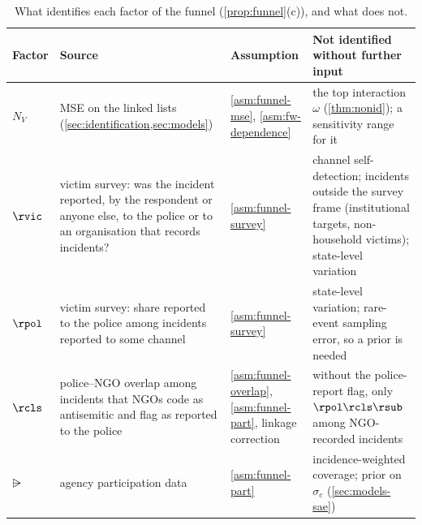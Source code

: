 \begin{table}[t]
\centering
\caption{What identifies each factor of the funnel (\cref{prop:funnel}(c)), and what does not.}\label{tab:funnel-sources}
\small
\begin{tabularx}{\textwidth}{@{}l>{\raggedright\arraybackslash}X l>{\raggedright\arraybackslash}X@{}}
\toprule
Factor & Source & Assumption & Not identified without further input \\
\midrule
$N_V$ & MSE on the linked lists (\cref{sec:identification,sec:models}) & \ref{asm:funnel-mse}, \cref{asm:fw-dependence} & the top interaction $\omega$ (\cref{thm:nonid}); a sensitivity range for it \\
$\rvic$ & victim survey: was the incident reported, by the respondent or anyone else, to the police or to an organisation that records incidents? & \ref{asm:funnel-survey} & channel self-detection; incidents outside the survey frame (institutional targets, non-household victims); state-level variation \\
$\rpol$ & victim survey: share reported to the police among incidents reported to some channel & \ref{asm:funnel-survey} & state-level variation; rare-event sampling error, so a prior is needed \\
$\rcls$ & police--NGO overlap among incidents that NGOs code as antisemitic and flag as reported to the police & \ref{asm:funnel-overlap}, \ref{asm:funnel-part}, linkage correction & without the police-report flag, only $\rpol\rcls\rsub$ among NGO-recorded incidents \\
$\rsub$ & agency participation data & \ref{asm:funnel-part} & incidence-weighted coverage; prior on $\sigma_c$ (\cref{sec:models-sae}) \\
\bottomrule
\end{tabularx}
\end{table}

